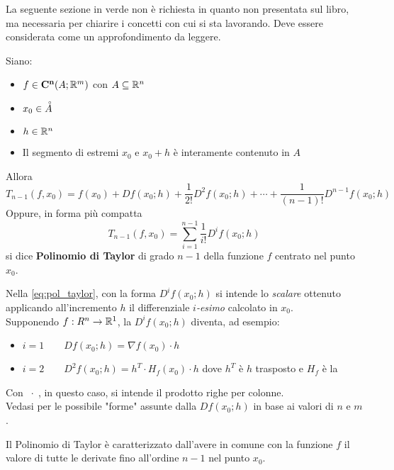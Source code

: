 \vspace*{\baselineskip}
La seguente sezione in \textcolor{not_explained_section_color}{verde} non è richiesta in quanto non presentata sul libro, ma necessaria per chiarire i concetti con cui si sta lavorando. Deve essere considerata come un approfondimento da leggere.
\color{not_explained_section_color}
\begin{definition}
	\label{def:pol_taylor}
	Siano:
	\begin{itemize}[noitemsep]
		\item $f \in \mathbf{C^{n}}(A;\mathbb{R}^m)$ con $A \subseteq \mathbb{R}^n$
		\item $x_0 \in \accentset{\circ}{A}$
		\item $h \in \mathbb{R}^n$
		\item Il segmento di estremi $x_0$ e $x_0 + h$ è interamente contenuto in $A$
	\end{itemize}
	Allora
	\[T_{n-1}(f, x_0) = f(x_0) + Df(x_0; h) + \frac{1}{2!} D^2f(x_0; h) + \cdots + \frac{1}{(n-1)!} D^{n-1}f(x_0; h)\]
	Oppure, in forma più compatta
	\begin{equation}
		\label{eq:pol_taylor}
			T_{n-1}(f, x_0) = \sum\limits_{i = 1}^{n-1} \frac{1}{i!} D^if(x_0; h)
	\end{equation}
	si dice \textbf{Polinomio di Taylor} di grado $n-1$ della funzione $f$ centrato nel punto $x_0$.

	\begin{note}
		Nella \cref{eq:pol_taylor}, con la forma $D^if(x_0; h)$ si intende lo \textit{scalare} ottenuto applicando all’incremento $h$ il differenziale $i$\textit{-esimo} calcolato in $x_0$.\\
		Supponendo $f: R^n \to \mathbb{R}^1$, la $D^if(x_0; h)$ diventa, ad esempio:
		\begin{itemize}
			\item $i = 1 \qquad Df(x_0; h) = \nabla f(x_0) \cdot h$
			\item $i = 2 \qquad D^2f(x_0; h) = h^T \cdot H_f(x_0) \cdot h$ \quad dove $h^T$ è $h$ trasposto e $H_f$ è la 
		\end{itemize}
		Con $\; \cdot \;$, in questo caso, si intende il prodotto righe per colonne.\\
		Vedasi  per le possibile "forme" assunte dalla $Df(x_0; h)$ in base ai valori di $n$ e $m$.
	\end{note}
\end{definition}
\begin{observation}
	Il Polinomio di Taylor è caratterizzato dall’avere in comune con la funzione $f$ il valore di tutte le derivate fino all’ordine $n-1$ nel punto $x_0$.
\end{observation}

